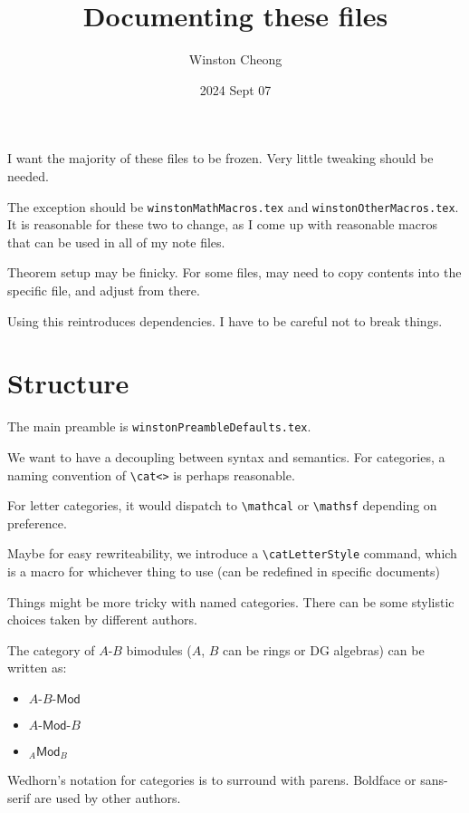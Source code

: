 \documentclass{scrartcl}
\title{Documenting these files}
\author{Winston Cheong}
\date{2024 Sept 07}
\begin{document}
\maketitle

I want the majority of these files to be frozen.
Very little tweaking should be needed.

The exception should be \texttt{winstonMathMacros.tex} and
\texttt{winstonOtherMacros.tex}.
It is reasonable for these two to change, as I come up with reasonable macros that can be used in all of my note files.

Theorem setup may be finicky. For some files, may need to copy contents into the
specific file, and adjust from there.



Using this reintroduces dependencies. I have to be careful not to break things.

\section{Structure}

The main preamble is \texttt{winstonPreambleDefaults.tex}.

We want to have a decoupling between syntax and semantics.
For categories, a naming convention of \verb|\cat<>| is perhaps reasonable.

For letter categories, it would dispatch to \verb|\mathcal| or \verb|\mathsf| depending on preference.

Maybe for easy rewriteability, we introduce a \verb|\catLetterStyle| command,
which is a macro for whichever thing to use (can be redefined in specific
documents)

Things might be more tricky with named categories. There can be some stylistic
choices taken by different authors.

The category of $A$-$B$ bimodules ($A$, $B$ can be rings or DG algebras) can be written as:
\begin{itemize}
    \item $A\text{-}B\text{-}\mathsf{Mod}$
    \item $A\text{-}\mathsf{Mod}\text{-}B$
    \item ${}_A\mathsf{Mod}_{B}$
\end{itemize}


Wedhorn's notation for categories is to surround with parens.
Boldface or sans-serif are used by other authors.
\end{document}

